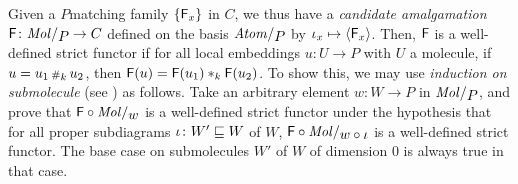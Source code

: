 \begin{comm} \label{comm:well_defined_amalgamation}
    Given a \( P \)\nbd matching family \( \left\{ {\mathsf{F}_x} \right\} \) in \( C \), we thus have a \emph{candidate amalgamation} \( \F \colon \molecin{P} \to C \) defined on the basis \( \atomin{P} \) by \( \iota_{x} \mapsto \langle\mathsf{F}_x\rangle \).
    Then, \( \mathsf{F} \) is a well-defined strict functor if for all local embeddings \( u \colon U \to P \) with \( U \) a molecule, if \( u = u_1 \,{\scriptstyle\#}_{k}\, u_2 \), then \( \mathsf{F}(u) = \mathsf{F}(u_1) *_{k} \mathsf{F}(u_2) \).
    To show this, we may use \emph{induction on submolecule} (see \cite[Comment 4.1.7]{hadzihasanovic2024combinatorics}) as follows.
    Take an arbitrary element \( w \colon W \to P \) in \( \molecin{P} \), and prove that \( \F \after \molecin{w} \) is a well-defined strict functor under the hypothesis that for all proper subdiagrams \( \iota \colon W' \sqsubseteq W \) of \( W \), \( \F \after \molecin{w \after \iota} \) is a well-defined strict functor.
    The base case on submolecules \( W' \) of \( W \) of dimension \( 0 \) is always true in that case. 
\end{comm}

